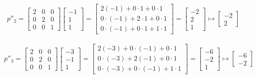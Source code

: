 \documentclass{article}
\begin{document}
\begin{align*}
	p''_2 = \begin{bmatrix}2&0&0\\ 0&2&0\\ 0&0&1\end{bmatrix}\begin{bmatrix}-1\\ 1\\ 1\end{bmatrix} = \begin{bmatrix}2\left(-1\right)+0\cdot 1+0\cdot 1\\ 0\cdot \left(-1\right)+2\cdot 1+0\cdot 1\\ 0\cdot \left(-1\right)+0\cdot 1+1\cdot 1\end{bmatrix} = \begin{bmatrix}-2\\ 2\\ 1\end{bmatrix} \mapsto \begin{bmatrix}-2\\ 2\end{bmatrix}
\end{align*}

\begin{align*}
	p''_3 = \begin{bmatrix}2&0&0\\ 0&2&0\\ 0&0&1\end{bmatrix}\begin{bmatrix}-3\\ -1\\ 1\end{bmatrix} = \begin{bmatrix}2\left(-3\right)+0\cdot \left(-1\right)+0\cdot 1\\ 0\cdot \left(-3\right)+2\left(-1\right)+0\cdot 1\\ 0\cdot \left(-3\right)+0\cdot \left(-1\right)+1\cdot 1\end{bmatrix} = \begin{bmatrix}-6\\ -2\\ 1\end{bmatrix} \mapsto \begin{bmatrix}-6\\ -2\end{bmatrix}
\end{align*}
\end{document}
